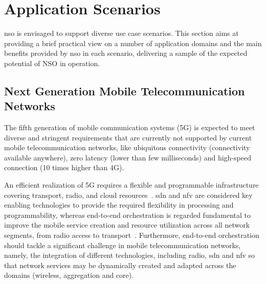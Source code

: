 \section{Application Scenarios}
\label{sec:scneario}

\gls{nso} is envisaged to support diverse use case scenarios. This section aims at providing a brief practical view on a number of application domains and the main benefits provided by \gls{nso} in each scenario, delivering a sample of the expected potential of NSO in operation. 


\subsection{Next Generation Mobile Telecommunication Networks}%

The fifth generation of mobile communication systems (5G) is expected to meet diverse and stringent requirements that are currently not supported by current mobile telecommunication networks, like ubiquitous connectivity (connectivity available anywhere), zero latency (lower than few milliseconds) and high-speed connection (10 times higher than 4G).

An efficient realization of 5G requires a flexible and programmable infrastructure covering transport, radio, and cloud resources~\cite{NGMN:5G:2017}. \gls{sdn} and \gls{nfv} are considered key enabling technologies to provide the required flexibility in processing and programmability, whereas end-to-end orchestration is regarded fundamental to improve the mobile service creation and resource utilization across all network segments, from radio access to transport~\cite{rostami-ran-transport-17}.
%
Furthermore, end-to-end orchestration should tackle  a significant challenge in mobile telecommunication networks, namely, the integration of different technologies, including radio, \gls{sdn} and \gls{nfv} so that network services may be dynamically created and adapted across the domains (wireless, aggregation and core). 




